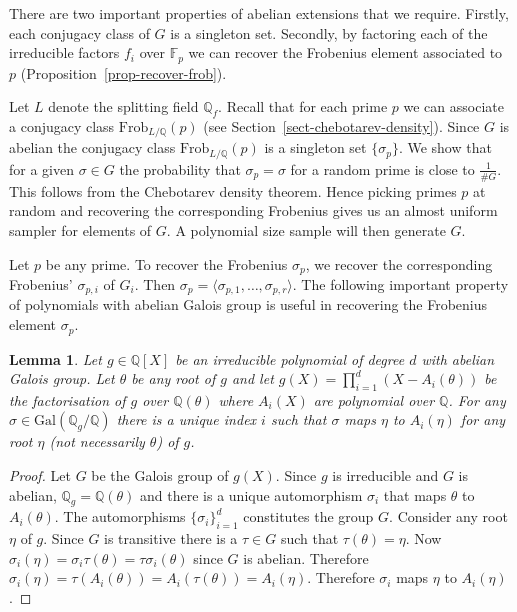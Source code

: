 \documentclass[11pt]{madras}%
\newtheorem{lemma}[theorem]{Lemma}
\theoremstyle{remark}
\newcommand{\Gal}[1]{{\ensuremath{\mathrm{Gal}\left(#1\right)}}}
\newcommand{\Artin}[2]{\ensuremath{\mathrm{Frob}_{#1}({#2})}}
\begin{document}
There are two important properties of abelian extensions that we
require.  Firstly, each conjugacy class of $G$ is a singleton set.
Secondly, by factoring each of the irreducible factors $f_i$ over
$\mathbb{F}_p$ we can recover the Frobenius element associated to $p$
(Proposition~\ref{prop-recover-frob}).

Let $L$ denote the splitting field $\mathbb{Q}_f$.  Recall that for
each prime $p$ we can associate a conjugacy class
$\Artin{L/\mathbb{Q}}{p}$ (see Section~\ref{sect-chebotarev-density}).
Since $G$ is abelian the conjugacy class $\Artin{L/\mathbb{Q}}{p}$ is
a singleton set $\{\sigma_p \}$. We show that for a given $\sigma \in
G$ the probability that $\sigma_p = \sigma$ for a random prime is
close to $\frac{1}{\# G}$. This follows from the Chebotarev density
theorem.  Hence picking primes $p$ at random and recovering the
corresponding Frobenius gives us an almost uniform sampler for
elements of $G$. A polynomial size sample will then generate $G$.

Let $p$ be any prime. To recover the Frobenius $\sigma_p$, we recover
the corresponding Frobenius' $\sigma_{p,i}$ of $G_i$. Then $\sigma_p =
\langle \sigma_{p,1},\ldots,\sigma_{p,r}\rangle$.  The following
important property of polynomials with abelian Galois group is useful
in recovering the Frobenius element $\sigma_p$.

\begin{lemma}\label{lem-abelian-galois}
  Let $g \in \mathbb{Q}[X]$ be an irreducible polynomial of degree $d$
  with abelian Galois group. Let $\theta$ be any root of $g$ and let
  $g(X) = \prod_{i=1}^d (X- A_i(\theta))$ be the factorisation of $g$
  over $\mathbb{Q}(\theta)$ where $A_i(X)$ are polynomial over
  $\mathbb{Q}$. For any $\sigma \in \Gal{\mathbb{Q}_g/\mathbb{Q}}$
  there is a unique index $i$ such that $\sigma$ maps $\eta$ to
  $A_i(\eta)$ for any root $\eta$ (not necessarily $\theta$) of $g$.
\end{lemma}
\begin{proof}
  Let $G$ be the Galois group of $g(X)$. Since $g$ is irreducible and
  $G$ is abelian, $\mathbb{Q}_g = \mathbb{Q}(\theta)$ and there is a
  unique automorphism $\sigma_i$ that maps $\theta$ to $A_i(\theta)$.
  The automorphisms $\{\sigma_i\}_{i=1}^d$ constitutes the group $G$.
  Consider any root $\eta$ of $g$.  Since $G$ is transitive there is a
  $\tau \in G$ such that $\tau(\theta) = \eta$. Now $\sigma_i (\eta) =
  \sigma_i \tau (\theta) = \tau \sigma_i (\theta)$ since $G$ is
  abelian.  Therefore $\sigma_i (\eta) = \tau (A_i(\theta)) =
  A_i(\tau(\theta)) = A_i(\eta)$.  Therefore $\sigma_i$ maps $\eta$ to
  $A_i(\eta)$.
\end{proof}
\end{document}
